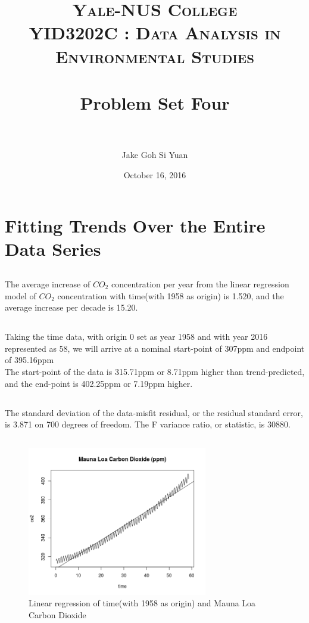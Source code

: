 \documentclass[paper=a4, fontsize=11pt]{scrartcl}
\title{	
\normalfont \normalsize 
\textsc{Yale-NUS College} \\ [20pt]
\textsc{YID3202C : Data Analysis in Environmental Studies } \\ [25pt] %
\horrule{0.5pt} \\[0.4cm] %
\huge Problem Set Four \\ %
\horrule{2pt} \\[0.5cm] %
}
\author{Jake Goh Si Yuan} %
\date{\normalsize October 16, 2016} %
\numberwithin{equation}{section} %
\numberwithin{figure}{section} %
\numberwithin{table}{section} %
\begin{document}
\maketitle %
\section{Fitting Trends Over the Entire Data Series}
\subsection{}
The average increase of $CO_2$ concentration per year from the linear regression model of $CO_2$ concentration with time(with 1958 as origin) is 1.520, and the average increase per decade is 15.20.

\subsection{}
Taking the time data, with origin 0 set as year 1958 and with year 2016 represented as 58, we will arrive at a nominal start-point of 307ppm and endpoint of 395.16ppm\\

The start-point of the data is 315.71ppm or 8.71ppm higher than trend-predicted, and the end-point is 402.25ppm or 7.19ppm higher.
\subsection{}

The standard deviation of the data-misfit residual, or the residual standard error, is 3.871 on 700 degrees of freedom. The F variance ratio, or statistic, is 30880.
\pagebreak
\subsection{}
\begin{figure}[htp]
	\centering
	\includegraphics[width=0.7\textwidth, clip]{q1aTime.png} 
	\caption{Linear regression of time(with 1958 as origin) and Mauna Loa Carbon Dioxide}
\end{figure}
\end{document}

